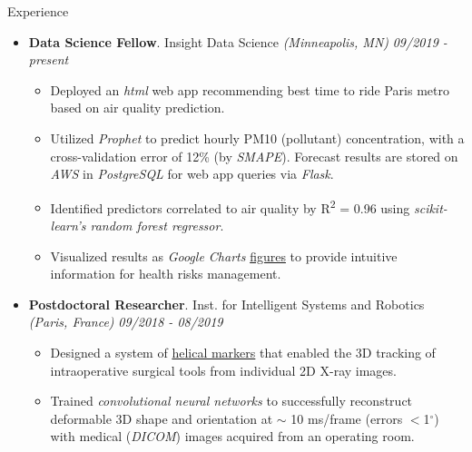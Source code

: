 \documentclass{resume} %
\begin{document}
	
	
	
	
	\begin{rSection}{Experience}
		
		\begin{itemize}[leftmargin=0em]
			\item {\bf Data Science Fellow}{. Insight Data Science \textit{(Minneapolis, MN)}} \hfill {\em 09/2019 - present}\\
			\vspace{-5mm}
			\begin{itemize}
				\setlength\itemsep{-1.75em}
				\item Deployed an \textit{html} web app recommending best time to ride Paris metro based on air quality prediction.\\
				\item Utilized \textit{Prophet} to predict hourly PM10 (pollutant) concentration, with a cross-validation error of 12\% (by \textit{SMAPE}). Forecast results are stored on \textit{AWS} in \textit{PostgreSQL} for web app queries via \textit{Flask}.\\
				\item Identified predictors correlated to air quality by R\textsuperscript{2} = 0.96 using \textit{scikit-learn's random forest regressor}.\\
				\item Visualized results as \textit{Google Charts} \href{https://tinyurl.com/yxptcaz7
				}{figures} to provide intuitive information for health risks management.
			\end{itemize}	
			
			\item {\bf Postdoctoral Researcher}{. Inst. for Intelligent Systems and Robotics \textit{(Paris, France)}} \hfill {\em 09/2018 - 08/2019}\\
			\vspace{-5mm}
			\begin{itemize}
				\setlength\itemsep{-1.75em}
				\item  Designed a system of \href{https://tinyurl.com/yxk4jou4}{helical markers} that enabled the 3D tracking of intraoperative surgical tools from individual 2D X-ray images.\\ 
				\item  Trained \textit{convolutional neural networks} to successfully reconstruct deformable 3D shape and orientation at $\sim$ 10 ms/frame (errors $<$1$^\circ$) with medical (\textit{DICOM}) images acquired from an operating room.
			\end{itemize}
			

\end{itemize}
\end{rSection}
\end{document}
